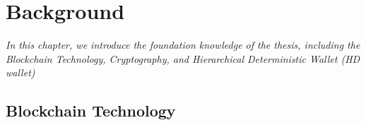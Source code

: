 \setlength{\abovedisplayskip}{0pt}
\setlength{\belowdisplayskip}{0pt}
\setlength{\abovedisplayshortskip}{0pt}
\setlength{\belowdisplayshortskip}{0pt}

\chapter{Background}
\label{chap:background}
\textit{In this chapter, we introduce the foundation knowledge of the thesis, including the Blockchain Technology, Cryptography, and Hierarchical Deterministic Wallet (HD wallet)}

\minitoc

\section{Blockchain Technology}



